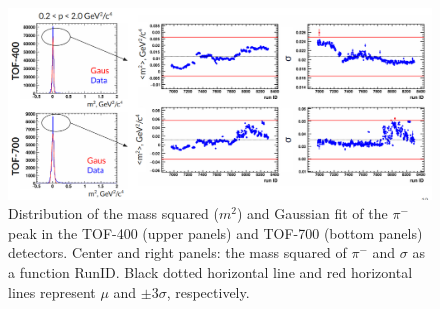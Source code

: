     \begin{figure}[H]
        \begin{center}
            \includegraphics[width=0.9\linewidth]{../pict/QA_RunByRun_24.12/pion_minus_m2.png}
            \vspace{-3mm}
            \caption{Distribution of the mass squared ($m^2$) and Gaussian fit of the $\pi^{-}$ peak in the TOF-400 (upper panels) and TOF-700 (bottom panels) detectors. Center and right panels: the mass squared of $\pi^{-}$ and $\sigma$ as a function RunID. Black dotted horizontal line and red horizontal lines represent $\mu$ and $\pm3\sigma$, respectively.}
        \end{center}
        \label{mass2_proton}
        \vspace{-5mm}
    \end{figure}

